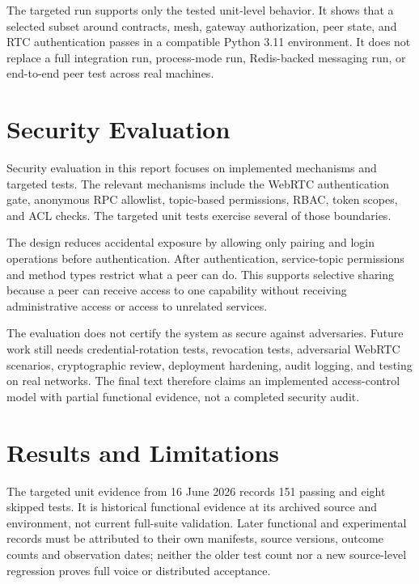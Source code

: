 The targeted run supports only the tested unit-level behavior. It shows that a selected subset around contracts, mesh, gateway authorization, peer state, and RTC authentication passes in a compatible Python 3.11 environment. It does not replace a full integration run, process-mode run, Redis-backed messaging run, or end-to-end peer test across real machines.

\section{Security Evaluation}
\label{sec:security-evaluation}

Security evaluation in this report focuses on implemented mechanisms and targeted tests. The relevant mechanisms include the WebRTC authentication gate, anonymous RPC allowlist, topic-based permissions, RBAC, token scopes, and ACL checks. The targeted unit tests exercise several of those boundaries.

The design reduces accidental exposure by allowing only pairing and login operations before authentication. After authentication, service-topic permissions and method types restrict what a peer can do. This supports selective sharing because a peer can receive access to one capability without receiving administrative access or access to unrelated services.

The evaluation does not certify the system as secure against adversaries. Future work still needs credential-rotation tests, revocation tests, adversarial WebRTC scenarios, cryptographic review, deployment hardening, audit logging, and testing on real networks. The final text therefore claims an implemented access-control model with partial functional evidence, not a completed security audit.

\section{Results and Limitations}
\label{sec:results-limitations}

The targeted unit evidence from 16 June 2026 records 151 passing and eight skipped tests. It is historical functional evidence at its archived source and environment, not current full-suite validation. Later functional and experimental records must be attributed to their own manifests, source versions, outcome counts and observation dates; neither the older test count nor a new source-level regression proves full voice or distributed acceptance.

